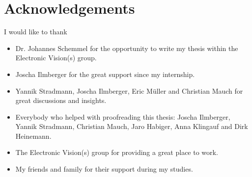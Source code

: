 \documentclass[10.5pt,a4paper,DIV=15]{scrartcl}
\begin{document}
\pagebreak{}
\section*{Acknowledgements}
I would like to thank
\begin{itemize}
\item Dr. Johannes Schemmel for the opportunity to write my thesis within the Electronic Vision(s) group.
\item Joscha Ilmberger for the great support since my internship.
\item Yannik Stradmann, Joscha Ilmberger, Eric Müller and Christian Mauch for great discussions and insights.
\item Everybody who helped with proofreading this thesis: Joscha Ilmberger, Yannik Stradmann, Christian Mauch, Jaro Habiger, Anna Klingauf and Dirk Heinemann.
\item The Electronic Vision(s) group for providing a great place to work.
\item My friends and family for their support during my studies.
\end{itemize}


\end{document}
